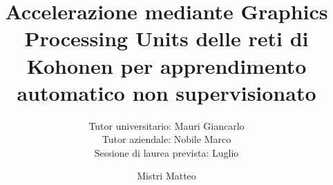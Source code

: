 \documentclass[a4paper,12pt]{scrartcl} %
\begin{document}

\title{Accelerazione mediante Graphics Processing Units delle reti di Kohonen per apprendimento automatico non supervisionato}
\subtitle{\vspace{1.5cm} 
	Tutor universitario: Mauri Giancarlo
	\\
	Tutor aziendale: Nobile Marco
	\\
	Sessione di laurea prevista: Luglio \vspace{2cm}}
 
\author{\vspace{2cm} Mistri Matteo}
\maketitle %
\newpage

\end{document}
